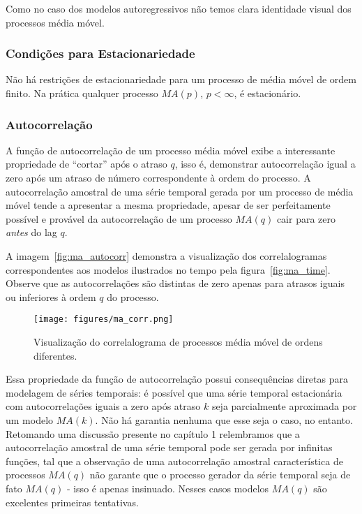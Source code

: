 Como no caso dos modelos autoregressivos não temos clara identidade visual dos
processos média móvel.

\subsubsection{Condições para Estacionariedade}

Não há restrições de estacionariedade para um processo de média móvel de ordem
finito. Na prática qualquer processo $MA(p)$, $p < \infty$, é estacionário.

\subsubsection{Autocorrelação}

A função de autocorrelação de um processo média móvel exibe a interessante
propriedade de ``cortar'' após o atraso $q$, isso é, demonstrar autocorrelação
igual a zero após um atraso de número correspondente à ordem do processo. A
autocorrelação amostral de uma série temporal gerada por um processo de média
móvel tende a apresentar a mesma propriedade, apesar de ser perfeitamente
possível e provável da autocorrelação de um processo $MA(q)$ cair para zero
\emph{antes} do lag $q$.

A imagem~\ref{fig:ma_autocorr} demonstra a visualização dos correlalogramas
correspondentes aos modelos ilustrados no tempo pela figura~\ref{fig:ma_time}.
Observe que as autocorrelações são distintas de zero apenas para atrasos
iguais ou inferiores à ordem $q$ do processo.

\begin{figure}[H]
    \centering
    \texttt{[image: figures/ma\_corr.png]}
    \caption{Visualização do correlalograma de processos média móvel de ordens
    diferentes.}
    \label{fig:ma_corr}
\end{figure}

Essa propriedade da função de autocorrelação possui consequências diretas
para modelagem de séries temporais: é possível que uma série temporal
estacionária com autocorrelações iguais a zero após atraso $k$ seja
parcialmente aproximada por um modelo $MA(k)$. Não há garantia nenhuma que
esse seja o caso, no entanto. Retomando uma discussão presente no capítulo 1
relembramos que a autocorrelação amostral de uma série temporal pode ser
gerada por infinitas funções, tal que a observação de uma autocorrelação
amostral característica de processos $MA(q)$ não garante que o processo
gerador da série temporal seja de fato $MA(q)$ - isso é apenas insinuado.
Nesses casos modelos $MA(q)$ são excelentes primeiras tentativas.


